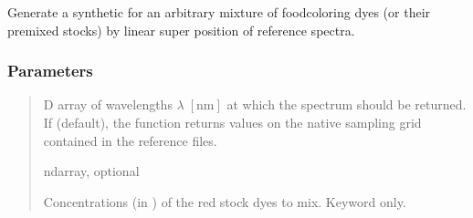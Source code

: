 \documentclass[letterpaper,10pt,english]{sphinxmanual}
\begin{document}
\begin{fulllineitems}
\label{\detokenize{generated/photon_canon.contrib.food_coloring:photon_canon.contrib.food_coloring.make_mix}}
\pysigstartsignatures
\pysiglinewithargsret
{}
{\sphinxparamcomma {}\sphinxparamcomma {}\sphinxparamcomma {}\sphinxparamcomma {}\sphinxparamcomma {}\sphinxparamcomma {}\sphinxparamcomma {}}
{}
\pysigstopsignatures
\sphinxAtStartPar
Generate a synthetic  for an arbitrary mixture
of food\sphinxhyphen{}coloring dyes (or their premixed stocks) by linear super\sphinxhyphen{}
position of reference spectra.


\subsubsection{Parameters}
\label{\detokenize{generated/photon_canon.contrib.food_coloring:parameters}}\begin{quote}\begin{description}
\sphinxAtStartPar
{}

\sphinxhyphen{}D array of wavelengths \(\lambda\;[\text{nm}]\) at which the spectrum should be returned.
If  (default), the function returns values on the native sampling grid contained in the reference files.

\sphinxAtStartPar
ndarray, optional

\sphinxAtStartPar
{}

\sphinxAtStartPar
Concentrations (in ) of the red stock dyes to mix. Keyword only.


\end{description}
\end{quote}
\end{fulllineitems}
\end{document}
